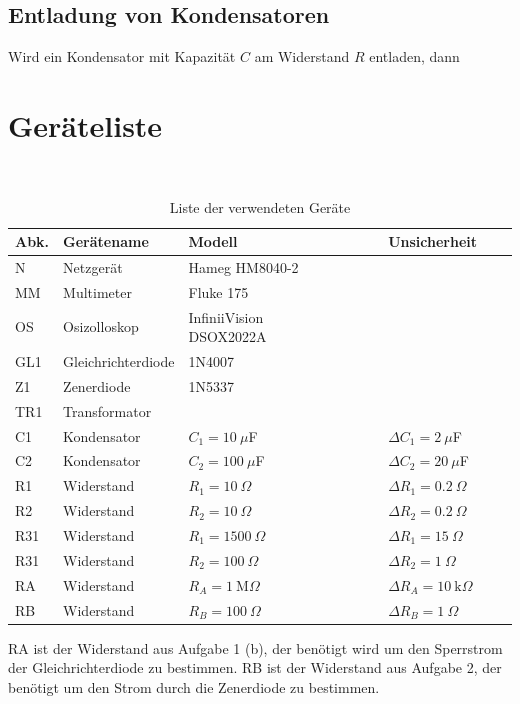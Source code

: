 \documentclass{article}
\begin{document}
\subsection{Entladung von Kondensatoren}

Wird ein Kondensator mit Kapazität $C$ am Widerstand $R$ entladen, dann 

\section{Geräteliste}

\begin{table}[H]
\caption{Liste der verwendeten Geräte}

~

\begin{tabular}{l|p{2cm}p{3cm}lll}
Abk. & Gerätename    &  Modell  & Unsicherheit\\
\hline
N & Netzgerät & Hameg HM8040-2 \\
MM & Multimeter & Fluke 175 \\
OS & Osizolloskop & InfiniiVision ~~~~~~~~~~~ DSOX2022A \\
GL1 & Gleichrichter\-diode  &  1N4007 \\
Z1 & Zenerdiode  &  1N5337 \\
TR1 & Transformator & \\
C1 & Kondensator & $C_1 = 10~\mu$F & $\Delta C_1 = 2~\mu$F \\
C2 & Kondensator & $C_2 = 100~\mu$F & $\Delta C_2 = 20~\mu$F \\
R1 & Widerstand & $R_1 = 10~\Omega$ & $\Delta R_1 = 0.2~\Omega$ \\
R2 & Widerstand & $R_2 = 10~\Omega$ & $\Delta R_2 = 0.2~\Omega$ \\
R31 & Widerstand & $R_1 = 1500~\Omega$ & $\Delta R_1 = 15~\Omega$ \\
R31 & Widerstand & $R_2 = 100~\Omega$ & $\Delta R_2 = 1~\Omega$ \\
RA & Widerstand & $R_A = 1~$M$\Omega$  & $\Delta R_A = 10~\text{k}\Omega$ \\
RB & Widerstand & $R_B = 100~\Omega$  & $\Delta R_B = 1~\Omega$
\end{tabular}
\end{table}

RA ist der Widerstand aus Aufgabe 1 (b), der benötigt wird um den Sperrstrom der Gleichrichterdiode  zu bestimmen.
RB ist der Widerstand aus Aufgabe 2, der benötigt um den Strom durch die Zenerdiode zu bestimmen.
\end{document}
